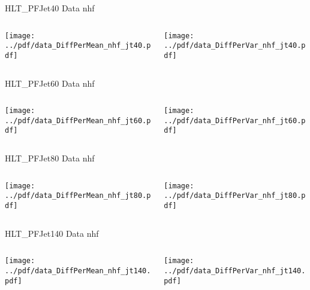 \documentclass[9pt]{beamer}
\begin{document}
\begin{frame}[t]{HLT\_PFJet40 Data nhf}
\begin{columns}[T]
  \begin{column}{.5\textwidth}
  \texttt{[image: ../pdf/data\_DiffPerMean\_nhf\_jt40.pdf]}
  \end{column}
  \begin{column}{.5\textwidth}
  \texttt{[image: ../pdf/data\_DiffPerVar\_nhf\_jt40.pdf]}
  \end{column}
\end{columns}
\end{frame}

\begin{frame}[t]{HLT\_PFJet60 Data nhf}
\begin{columns}[T]
  \begin{column}{.5\textwidth}
  \texttt{[image: ../pdf/data\_DiffPerMean\_nhf\_jt60.pdf]}
  \end{column}
  \begin{column}{.5\textwidth}
  \texttt{[image: ../pdf/data\_DiffPerVar\_nhf\_jt60.pdf]}
  \end{column}
\end{columns}
\end{frame}

\begin{frame}[t]{HLT\_PFJet80 Data nhf}
\begin{columns}[T]
  \begin{column}{.5\textwidth}
  \texttt{[image: ../pdf/data\_DiffPerMean\_nhf\_jt80.pdf]}
  \end{column}
  \begin{column}{.5\textwidth}
  \texttt{[image: ../pdf/data\_DiffPerVar\_nhf\_jt80.pdf]}
  \end{column}
\end{columns}
\end{frame}

\begin{frame}[t]{HLT\_PFJet140 Data nhf}
\begin{columns}[T]
  \begin{column}{.5\textwidth}
  \texttt{[image: ../pdf/data\_DiffPerMean\_nhf\_jt140.pdf]}
  \end{column}
  \begin{column}{.5\textwidth}
  \texttt{[image: ../pdf/data\_DiffPerVar\_nhf\_jt140.pdf]}
  \end{column}
\end{columns}
\end{frame}
\end{document}

